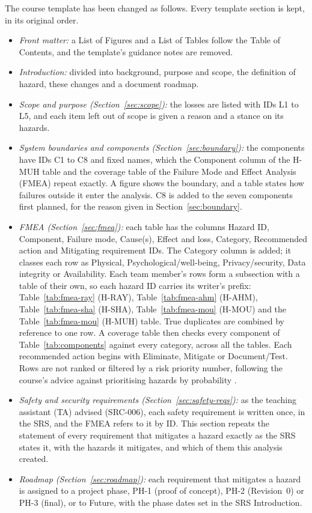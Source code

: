 \documentclass{article}
\begin{document}
The course template has been changed as follows. Every template section is kept,
in its original order.
\begin{itemize}
  \item \emph{Front matter:} a List of Figures and a List of Tables follow the
  Table of Contents, and the template's guidance notes are removed.
  \item \emph{Introduction:} divided into background, purpose and scope, the
  definition of hazard, these changes and a document roadmap.
  \item \emph{Scope and purpose (Section~\ref{sec:scope}):} the losses are
  listed with IDs L1 to L5, and each item left out of scope is given a reason
  and a stance on its hazards.
  \item \emph{System boundaries and components (Section~\ref{sec:boundary}):}
  the components have IDs C1 to C8 and fixed names, which the Component column
  of the H-MUH table and the coverage table of the Failure Mode and Effect
  Analysis (FMEA) repeat exactly. A figure shows the boundary, and a table
  states how failures outside it enter the analysis. C8 is added to the seven
  components first planned, for the reason given in Section~\ref{sec:boundary}.
  \item \emph{FMEA (Section~\ref{sec:fmea}):} each table has the columns Hazard
  ID, Component, Failure mode, Cause(s), Effect and loss, Category, Recommended
  action and Mitigating requirement IDs. The Category column is added; it
  classes each row as Physical, Psychological/well-being, Privacy/security, Data
  integrity or Availability. Each team member's rows form a subsection with a
  table of their own, so each hazard ID carries its writer's prefix:
  Table~\ref{tab:fmea-ray} (H-RAY), Table~\ref{tab:fmea-ahm} (H-AHM),
  Table~\ref{tab:fmea-sha} (H-SHA), Table~\ref{tab:fmea-mou} (H-MOU) and the
  Table~\ref{tab:fmea-mou} (H-MUH) table. True duplicates are combined by
  reference to one row. A coverage table then checks every component of
  Table~\ref{tab:components} against every category, across all the tables. Each
  recommended action begins with Eliminate, Mitigate or Document/Test. Rows are
  not ranked or filtered by a risk priority number, following the course's
  advice against prioritising hazards by probability \citep{Smith2026L08}.
  \item \emph{Safety and security requirements (Section~\ref{sec:safety-reqs}):}
  as the teaching assistant (TA) advised (SRC-006), each safety requirement is
  written once, in the SRS, and the FMEA refers to it by ID. This section
  repeats the statement of every requirement that mitigates a hazard exactly as
  the SRS states it, with the hazards it mitigates, and which of them this
  analysis created.
  \item \emph{Roadmap (Section~\ref{sec:roadmap}):} each requirement that
  mitigates a hazard is assigned to a project phase, PH-1 (proof of concept), PH-2
  (Revision~0) or PH-3 (final), or to Future, with the phase dates set in the
  SRS Introduction.
\end{itemize}
\end{document}
